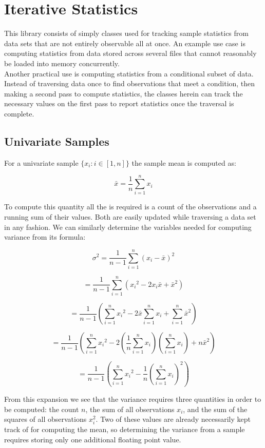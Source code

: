 \documentclass{article}
\begin{document}
\pagestyle{fancy}
\fancyhf{}
\renewcommand{\headrulewidth}{0pt}
\fancyfoot[R]{\thepage}

\section*{Iterative Statistics}

This library consists of simply classes used for tracking sample statistics from data sets that are not entirely observable all at once. An example use case is computing statistics from data stored across several files that cannot reasonably be loaded into memory concurrently.\\ 

Another practical use is computing statistics from a conditional subset of data. Instead of traversing data once to find observations that meet a condition, then making a second pass to compute statistics, the classes herein can track the necessary values on the first pass to report statistics once the traversal is complete.


\subsection*{Univariate Samples}

For a univariate sample $\{x_i : i\in \left[1, n\right]\}$ the sample mean is computed as:

$$\bar{x} = \frac{1}{n}\sum_{i=1}^n x_i$$

To compute this quantity all the is required is a count of the observations and a running sum of their values. Both are easily updated while traversing a data set in any fashion. We can similarly determine the variables needed for computing variance from its formula:

$$\sigma^2=\frac{1}{n-1}\sum_{i=1}^n \left(x_i - \bar{x}\right)^2$$

$$=\frac{1}{n-1}\sum_{i=1}^n \left({x_i}^2 - 2x_i\bar{x} + \bar{x}^2 \right)$$

$$=\frac{1}{n-1} \left( \sum_{i=1}^n {x_i}^2 - 2\bar{x}\sum_{i=1}^n x_i + \sum_{i=1}^n \bar{x}^2 \right)$$

$$=\frac{1}{n-1} \left( \sum_{i=1}^n {x_i}^2 - 2\left(\frac{1}{n}\sum_{i=1}^n x_i\right)\left(\sum_{i=1}^n x_i\right) + n\bar{x}^2 \right)$$

$$=\frac{1}{n-1} \left( \sum_{i=1}^n {x_i}^2 - \frac{1}{n}\left(\sum_{i=1}^n x_i\right)^2 \right)$$
\bigskip

From this expansion we see that the variance requires three quantities in order to be computed: the count $n$, the sum of all observations $x_i$, and the sum of the squares of all observations $x_i^2$. Two of these values are already necessarily kept track of for computing the mean, so determining the variance from a sample requires storing only one additional floating point value.
\end{document}
